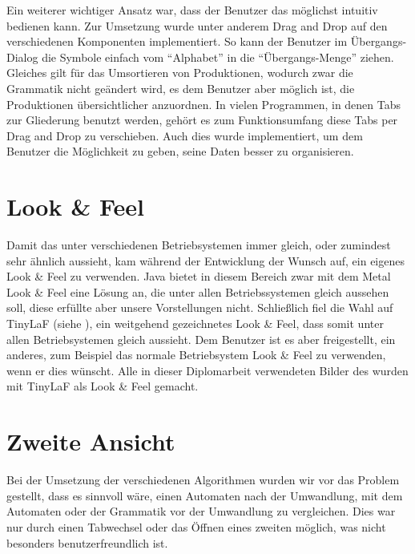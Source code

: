 Ein weiterer wichtiger Ansatz war, dass der Benutzer das \gtitool möglichst
intuitiv bedienen kann. Zur Umsetzung wurde unter anderem Drag and Drop auf den
verschiedenen Komponenten implementiert. So kann der Benutzer im Übergangs-Dialog
die Symbole einfach vom "`Alphabet"' in die "`Übergangs-Menge"' ziehen. Gleiches
gilt für das Umsortieren von Produktionen, wodurch zwar die Grammatik nicht
geändert wird, es dem Benutzer aber möglich ist, die Produktionen übersichtlicher
anzuordnen. In vielen Programmen, in denen Tabs zur Gliederung benutzt werden,
gehört es zum Funktionsumfang diese Tabs per Drag and Drop zu verschieben. Auch
dies wurde implementiert, um dem Benutzer die Möglichkeit zu geben, seine Daten besser zu
organisieren.\vspace{10pt}


\section{Look \& Feel}\label{LookAndFeel}

Damit das \gtitool unter verschiedenen Betriebsystemen immer gleich, oder
zumindest sehr ähnlich aussieht, kam während der Entwicklung der Wunsch auf, ein
eigenes Look \& Feel zu verwenden. Java bietet in diesem Bereich zwar mit dem
Metal Look \& Feel eine Lösung an, die unter allen Betriebssystemen gleich
aussehen soll, diese erfüllte aber unsere Vorstellungen nicht. Schließlich fiel
die Wahl auf TinyLaF (siehe \cite{tinylaf}), ein weitgehend gezeichnetes
Look \& Feel, dass somit unter allen Betriebsystemen gleich aussieht. Dem
Benutzer ist es aber freigestellt, ein anderes, zum Beispiel das normale
Betriebsystem Look \& Feel zu verwenden, wenn er dies wünscht. Alle in dieser
Diplomarbeit verwendeten Bilder des \gtitools wurden mit TinyLaF als Look \&
Feel gemacht.\vspace{10pt}


\section{Zweite Ansicht}\label{SecondView}

Bei der Umsetzung der verschiedenen Algorithmen wurden wir vor das Problem
gestellt, dass es sinnvoll wäre, einen Automaten nach der Umwandlung, mit dem
Automaten oder der Grammatik vor der Umwandlung zu vergleichen. Dies war nur
durch einen Tabwechsel oder das Öffnen eines zweiten \gtitools möglich, was
nicht besonders benutzerfreundlich ist.\vspace{10pt}

